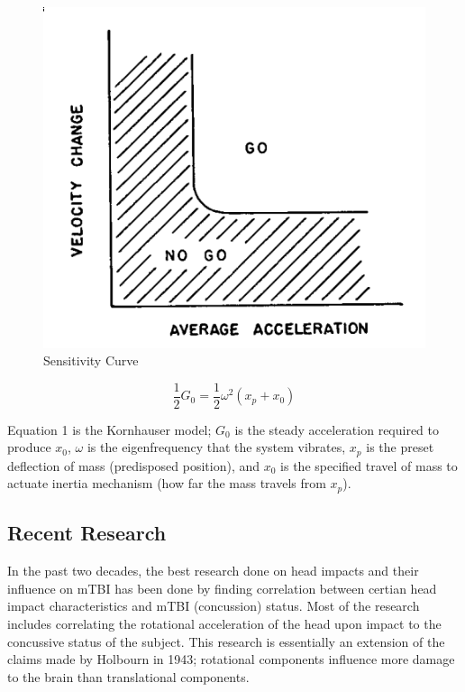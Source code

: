 \documentclass[%
 aip,
 amsmath,amssymb,
 reprint,%
 floatfix,%
]{revtex4-1}
\begin{document}
\begin{figure}
	\centering
	\includegraphics[scale=0.4]{sensitivitycurve.png}
	\caption{Sensitivity Curve\cite{Kornhauser1954}}
\end{figure}

\begin{equation}
	\frac{1}{2}G_0 = \frac{1}{2}\omega^2 (x_p + x_0)
\end{equation}

Equation 1 is the Kornhauser model; $G_0$ is the steady acceleration required to produce $x_0$, $\omega$ is the eigenfrequency that the system vibrates, $x_p$ is the preset deflection of mass (predisposed position), and $x_0$ is the specified travel of mass to actuate inertia mechanism (how far the mass travels from $x_p$).

\subsection{Recent Research}

In the past two decades, the best research done on head impacts and their influence on mTBI has been done by finding correlation between certian head impact characteristics and mTBI (concussion) status. Most of the research includes correlating the rotational acceleration of the head upon impact to the concussive status of the subject. This research is essentially an extension of the claims made by Holbourn in 1943; rotational components influence more damage to the brain than translational components. 
\end{document}
